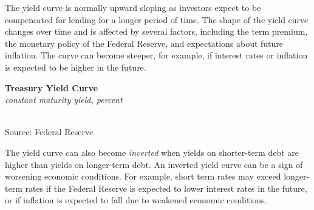 \documentclass{report}
\newcommand{\bbar}[2]{extra #1 ticks = {{#2}}, extra #1 tick labels = ,
		extra #1 tick style = {grid=major, grid style={thick, black!25}},}
\begin{document}
{{\begin{minipage}{0.76\textwidth}
The yield curve is normally upward sloping as investors expect to be compensated for lending for a longer period of time. The shape of the yield curve changes over time and is affected by several factors, including the term premium, the monetary policy of the Federal Reserve, and expectations about future inflation. The curve can become steeper, for example, if interest rates or inflation is expected to be higher in the future. 
\end{minipage}
\vspace{1mm}

\begin{minipage}{0.39\textwidth}
\normalsize \textbf{Treasury Yield Curve}\\
\footnotesize{\textit{constant maturity yield, percent}}\\
\hspace*{-2mm} \\
\footnotesize{Source: Federal Reserve} 
\end{minipage} \hspace{4mm}
\begin{minipage}{0.33\textwidth}
\small The yield curve can also become \textit{inverted} when yields on shorter-term debt are higher than yields on longer-term debt. An inverted yield curve can be a sign of worsening economic conditions. For example, short term rates may exceed longer-term rates if the Federal Reserve is expected to lower interest rates in the future, or if inflation is expected to fall due to weakened economic conditions. 


\end{minipage}}}
\end{document}
